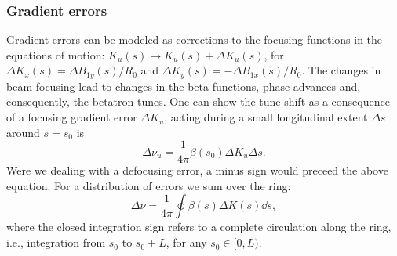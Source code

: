 
\subsubsection{Gradient errors}
Gradient errors can be modeled as corrections to the focusing functions in the equations of motion: $K_u(s)\to K_u(s) + \Delta K_u(s)$, for $\Delta K_x(s) = \Delta B_{1y}(s)/R_0$ and $\Delta K_y(s) = -\Delta B_{1x}(s)/R_0$. The changes in beam focusing lead to changes in the beta-functions, phase advances and, consequently, the betatron tunes. One can show the tune-shift as a consequence of a focusing gradient error $\Delta K_u$, acting during a small longitudinal extent $\Delta s$ around $s=s_0$ is \cite{lee_accelerator_2004}
\begin{equation}
    \Delta \nu_u = \frac{1}{4\pi} \beta(s_0) \Delta K_u \Delta s.
    \label{eq:delta_nu}
\end{equation}
Were we dealing with a defocusing error, a minus sign would preceed the above equation. For a distribution of errors we sum over the ring:
\begin{equation}
    \Delta \nu = \frac{1}{4\pi}\oint \beta(s) \Delta K(s) \dd s,
    \label{eq:delta_nu_dist}
\end{equation}
where the closed integration sign refers to a complete circulation along the ring, i.e., integration from $s_0$ to $s_0+L$, for any $s_0\in[0,L)$.

